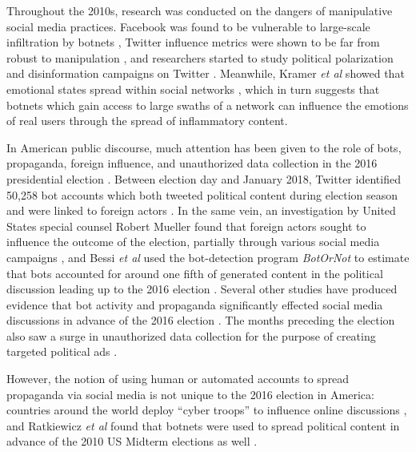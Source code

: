 \documentclass[sigconf,authordraft]{acmart}
\newcommand{\etal}{{\itshape et al }}
\begin{document}
Throughout the 2010s, research was conducted on the dangers of manipulative social media practices. Facebook was found to be vulnerable to large-scale infiltration by botnets \cite{boshmaf2013design}, Twitter influence metrics were shown to be far from robust to manipulation \cite{messias2013you}, and researchers started to study political polarization and disinformation campaigns on Twitter \cite{ratkiewicz2011detecting,conover2011political}. Meanwhile, Kramer \etal showed that emotional states spread within social networks \cite{kramer2014experimental}, which in turn suggests that botnets which gain access to large swaths of a network can influence the emotions of real users through the spread of inflammatory content. 


In American public discourse, much attention has been given to the role of bots, propaganda, foreign influence, and unauthorized data collection in the 2016 presidential election \cite{Quartz_twitterbotstory, CambridgeAnalyticaNYT, NYT_opinion_chatbot}. Between election day and January 2018, Twitter identified 50,258 bot accounts which both tweeted political content during election season and were linked to foreign actors \cite{Twitter2016BotReport}. In the same vein, an investigation by United States special counsel Robert Mueller found that foreign actors sought to influence the outcome of the election, partially through various social media campaigns \cite{mueller2019report}, and Bessi \etal used the bot-detection program {\itshape BotOrNot} \cite{davis2016botornot} to estimate that bots accounted for around one fifth of generated content in the political discussion leading up to the 2016 election \cite{bessi2016social}. Several other studies have  produced evidence that bot activity and propaganda significantly effected social media discussions in advance of the 2016 election \cite{howard2017junk, badawy2018analyzing, woolley2017computational, shao2018spread}. The months preceding the election also saw a surge in unauthorized data collection for the purpose of creating targeted political ads \cite{CambridgeAnalyticaNYT}.

However, the notion of using human or automated accounts to spread propaganda via social media is not unique to the 2016 election in America: countries around the world deploy ``cyber troops'' to influence online discussions \cite{bradshaw2017troops}, and Ratkiewicz \etal found that botnets were used to spread political content in advance of the 2010 US Midterm elections as well \cite{ratkiewicz2011truthy}.
\end{document}
